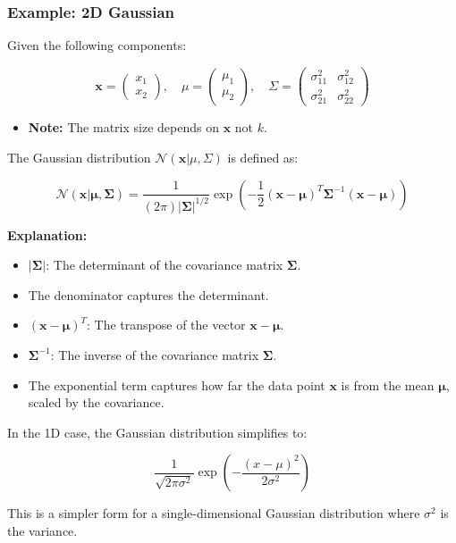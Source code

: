 \subsubsection{Example: 2D Gaussian}
\begin{example}
    Given the following components:

    \[
    \mathbf{x} = \begin{pmatrix} x_1 \\ x_2 \end{pmatrix}, \quad 
    \mu = \begin{pmatrix} \mu_1 \\ \mu_2 \end{pmatrix}, \quad
    \Sigma = \begin{pmatrix} 
    \sigma_{11}^2 & \sigma_{12}^2 \\ 
    \sigma_{21}^2 & \sigma_{22}^2 
    \end{pmatrix}
    \]
    \begin{itemize}
        \item \textbf{Note:} The matrix size depends on $\mathbf{x}$ not $k$.
     \end{itemize}

    The Gaussian distribution \( \mathcal{N}(\mathbf{x} | \mu, \Sigma) \) is defined as:

    \[
    \mathcal{N}(\mathbf{x} | \mathbf{\mu}, \mathbf{\Sigma}) = \frac{1}{(2\pi) |\mathbf{\Sigma}|^{1/2}} \exp \left( -\frac{1}{2} (\mathbf{x} - \mathbf{\mu})^T \mathbf{\Sigma}^{-1} (\mathbf{x} - \mathbf{\mu}) \right)
    \]

    \textbf{Explanation:}
    \begin{itemize}
        \item \( |\mathbf{\Sigma}| \): The determinant of the covariance matrix \( \mathbf{\Sigma} \).
        \item The denominator captures the determinant. 
        \item \( (\mathbf{x} - \mathbf{\mu})^T \): The transpose of the vector \( \mathbf{x} - \mathbf{\mu}\).
        \item \( \mathbf{\Sigma}^{-1} \): The inverse of the covariance matrix \( \mathbf{\Sigma} \).
        \item The exponential term captures how far the data point \( \mathbf{x} \) is from the mean \( \mathbf{\mu} \), scaled by the covariance.
    \end{itemize}
    \vspace{1em}

    In the 1D case, the Gaussian distribution simplifies to:

    \[
    \frac{1}{\sqrt{2\pi \sigma^2}} \exp \left( -\frac{(x - \mu)^2}{2\sigma^2} \right)
    \]
    
    This is a simpler form for a single-dimensional Gaussian distribution where \( \sigma^2 \) is the variance.
\end{example}

